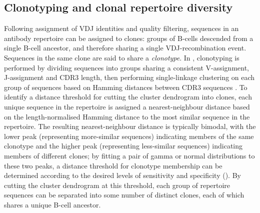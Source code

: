 \subsection{Clonotyping and clonal repertoire diversity}
\label{sec:igseq_pilot_clones}

Following assignment of VDJ identities and quality filtering, sequences in an antibody repertoire can be assigned to clones: groups of B-cells descended from a single \naive B-cell ancestor, and therefore sharing a single VDJ-recombination event. Sequences in the same clone are said to share a \textit{clonotype}. In , clonotyping is performed by dividing sequences into groups sharing a consistent V-assignment, J-assignment and CDR3 length, then performing single-linkage clustering on each group of sequences based on Hamming distances between CDR3 sequences \parencite{gupta2017hierarchical}. To identify a distance threshold for cutting the cluster dendrogram into clones, each unique sequence in the repertoire is assigned a nearest-neighbour distance based on the length-normalised Hamming distance to the most similar sequence in the repertoire. The resulting nearest-neighbour distance is typically bimodal, with the lower peak (representing more-similar sequences) indicating members of the same clonotype and the higher peak (representing less-similar sequences) indicating members of different clones; by fitting a pair of gamma or normal distributions to these two peaks, a distance threshold for clonotype membership can be determined according to the desired levels of sensitivity and specificity \parencite{nouri2018threshold} (). By cutting the cluster dendrogram at this threshold, each group of repertoire sequences can be separated into some number of distinct clones, each of which shares a unique \naive B-cell ancestor.

